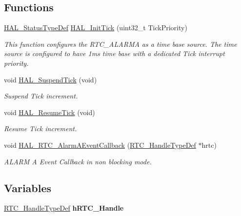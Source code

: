 \subsection*{Functions}
\begin{DoxyCompactItemize}
\item 
\hyperlink{stm32f0xx__hal__def_8h_a63c0679d1cb8b8c684fbb0632743478f}{H\+A\+L\+\_\+\+Status\+Type\+Def} \hyperlink{group___h_a_l___time_base___r_t_c___alarm___template_ga879cdb21ef051eb81ec51c18147397d5}{H\+A\+L\+\_\+\+Init\+Tick} (uint32\+\_\+t Tick\+Priority)
\begin{DoxyCompactList}\small\item\em This function configures the R\+T\+C\+\_\+\+A\+L\+A\+R\+MA as a time base source. The time source is configured to have 1ms time base with a dedicated Tick interrupt priority. \end{DoxyCompactList}\item 
void \hyperlink{group___h_a_l___time_base___r_t_c___alarm___template_gaaf651af2afe688a991c657f64f8fa5f9}{H\+A\+L\+\_\+\+Suspend\+Tick} (void)
\begin{DoxyCompactList}\small\item\em Suspend Tick increment. \end{DoxyCompactList}\item 
void \hyperlink{group___h_a_l___time_base___r_t_c___alarm___template_ga24e0ee9dae1ec0f9d19200f5575ff790}{H\+A\+L\+\_\+\+Resume\+Tick} (void)
\begin{DoxyCompactList}\small\item\em Resume Tick increment. \end{DoxyCompactList}\item 
void \hyperlink{group___h_a_l___time_base___r_t_c___alarm___template_ga11aeff83fd498cddbed3bcddcf017e0a}{H\+A\+L\+\_\+\+R\+T\+C\+\_\+\+Alarm\+A\+Event\+Callback} (\hyperlink{struct_r_t_c___handle_type_def}{R\+T\+C\+\_\+\+Handle\+Type\+Def} $\ast$hrtc)
\begin{DoxyCompactList}\small\item\em A\+L\+A\+RM A Event Callback in non blocking mode. \end{DoxyCompactList}\end{DoxyCompactItemize}
\subsection*{Variables}
\begin{DoxyCompactItemize}
\item 
\mbox{\label{group___h_a_l___time_base___r_t_c___alarm___template_ga66edbb38f0b45759c28ecd5aede14478}} 
\hyperlink{struct_r_t_c___handle_type_def}{R\+T\+C\+\_\+\+Handle\+Type\+Def} {\bfseries h\+R\+T\+C\+\_\+\+Handle}
\end{DoxyCompactItemize}


